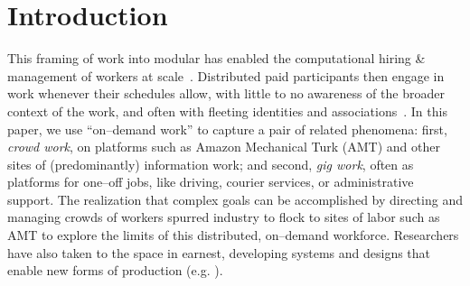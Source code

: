 \documentclass[trackingWork]{subfiles}
\begin{document}
\section{Introduction}\label{sec:introduction}


This framing of work into modular
has enabled the computational hiring \& management of workers at scale~\cite{howe2008crowdsourcing,Bigham2014,crowdworkFuture}.
Distributed paid participants then engage in work whenever their schedules allow,
with little to no awareness of the broader context of the work, and
often with fleeting identities and associations~\cite{martin2014being,uberAlgorithm}.
In this paper, we use ``on--demand work'' to capture a pair of related phenomena:
first, \textit{crowd work}, on platforms such as Amazon Mechanical Turk (AMT) and other sites of (predominantly) information work;
and second, \textit{gig work}, often as platforms for one--off jobs, like driving, courier services, or administrative support.
The realization that complex goals can be accomplished by directing and managing crowds of workers spurred industry to flock to sites of labor
such as AMT to explore the limits of this distributed, on--demand workforce.
Researchers have also taken to the space in earnest,
developing systems and designs that enable new forms of production
(e.g. \cite{bernsteinSoylent,vizwiz,paolacci2010running}).
\end{document}
